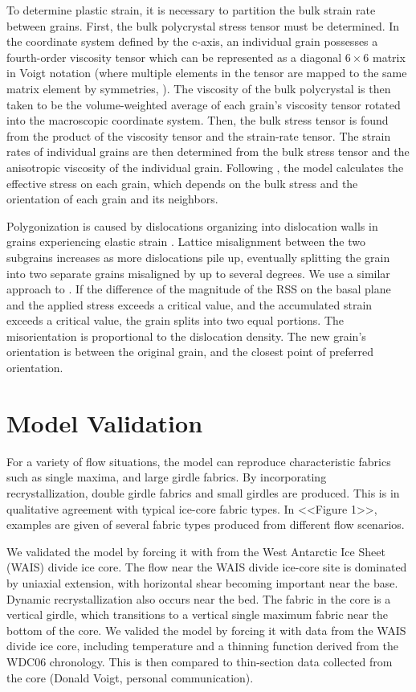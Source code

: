 \documentclass{igs}
\begin{document}
To determine plastic strain, it is necessary to partition the bulk strain rate between grains. First, the bulk polycrystal stress tensor must be determined. In the coordinate system defined by the c-axis, an individual grain possesses a fourth-order viscosity tensor which can be represented as a diagonal $6 \times 6$ matrix in Voigt notation (where multiple elements in the tensor are mapped to the same matrix element by symmetries, \citet{vnote}). The viscosity of the bulk polycrystal is then taken to be the volume-weighted average of each grain's viscosity tensor rotated into the macroscopic coordinate system. Then, the bulk stress tensor is found from the product of the viscosity tensor and the strain-rate tensor. The strain rates of individual grains are then determined from the bulk stress tensor and the anisotropic viscosity of the individual grain. Following \citet{azuma96}, the model calculates the effective stress on each grain, which depends on the bulk stress and the orientation of each grain and its neighbors.  

Polygonization is caused by dislocations organizing into dislocation walls in grains experiencing elastic strain \citep{duval1995}. Lattice misalignment between the two subgrains increases as more dislocations pile up, eventually splitting the grain into two separate grains misaligned by up to several degrees. We use a similar approach to \citet{thorsteinsson2002nni}. If the difference of the magnitude of the RSS on the basal plane and the applied stress exceeds a critical value, and the accumulated strain exceeds a critical value, the grain splits into two equal portions. The misorientation is proportional to the dislocation density. The new grain's orientation is between the original grain, and the closest point of preferred orientation. 



\section{Model Validation}
For a variety of flow situations, the model can reproduce characteristic fabrics such as single maxima, and large girdle fabrics. By incorporating recrystallization, double girdle fabrics and small girdles are produced. This is in qualitative agreement with typical ice-core fabric types. In <<Figure 1>>, examples are given of several fabric types produced from different flow scenarios. 

We validated the model by forcing it with from the West Antarctic Ice Sheet (WAIS) divide ice core. The flow near the WAIS divide ice-core site is dominated by uniaxial extension, with horizontal shear becoming important near the base. Dynamic recrystallization also occurs near the bed. The fabric in the core is a vertical girdle, which transitions to a vertical single maximum fabric near the bottom of the core. We valided the model by forcing it with data from the WAIS divide ice core, including temperature and a thinning function derived from the WDC06 chronology. This is then compared to thin-section data collected from the core (Donald Voigt, personal communication).
\end{document}
